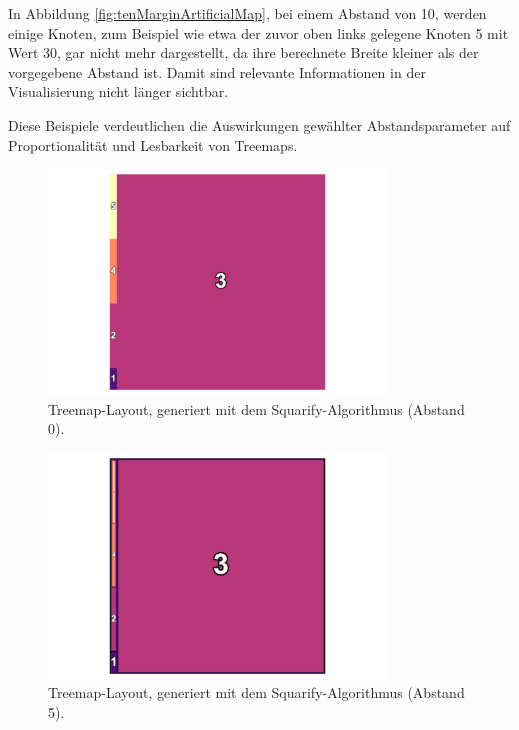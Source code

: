 In Abbildung \ref{fig:tenMarginArtificialMap}, bei einem Abstand von 10, werden einige Knoten, zum Beispiel wie etwa der zuvor oben links gelegene Knoten 5 mit Wert 30, gar nicht mehr dargestellt, da ihre berechnete Breite kleiner als der vorgegebene Abstand ist. Damit sind relevante Informationen in der Visualisierung nicht länger sichtbar.

Diese Beispiele verdeutlichen die Auswirkungen gewählter Abstandsparameter auf Proportionalität und Lesbarkeit von Treemaps.

\begin{figure}
    \centering
    \includegraphics[width=0.8\textwidth]{images/zeroMarginArtificialMap.png}
    \caption{Treemap-Layout, generiert mit dem Squarify-Algorithmus (Abstand 0).} 
    \label{fig:zeroMarginArtificialMap}
\end{figure}

\begin{figure}
    \centering
    \includegraphics[width=0.8\textwidth]{images/fiveMarginArtifialMap.png}
    \caption{Treemap-Layout, generiert mit dem Squarify-Algorithmus (Abstand 5).}
    \label{fig:fiveMarginArtificialMap}
\end{figure}

